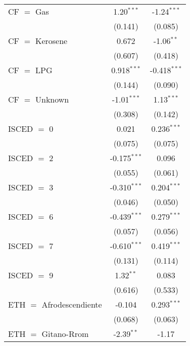 \begin{table}[htbp!]
\begin{adjustbox}{width = 1\textwidth, max height = 0.95\textheight, center}
\begin{threeparttable}[b]
\begin{tabular}{lcc}
            CF $=$ Gas                     & 1.20$^{***}$   & -1.24$^{***}$\\   
                                           & (0.141)        & (0.085)\\   
            CF $=$ Kerosene                & 0.672          & -1.06$^{**}$\\   
                                           & (0.607)        & (0.418)\\   
            CF $=$ LPG                     & 0.918$^{***}$  & -0.418$^{***}$\\   
                                           & (0.144)        & (0.090)\\   
            CF $=$ Unknown                 & -1.01$^{***}$  & 1.13$^{***}$\\   
                                           & (0.308)        & (0.142)\\   
            ISCED $=$ 0                    & 0.021          & 0.236$^{***}$\\   
                                           & (0.075)        & (0.075)\\   
            ISCED $=$ 2                    & -0.175$^{***}$ & 0.096\\   
                                           & (0.055)        & (0.061)\\   
            ISCED $=$ 3                    & -0.310$^{***}$ & 0.204$^{***}$\\   
                                           & (0.046)        & (0.050)\\   
            ISCED $=$ 6                    & -0.439$^{***}$ & 0.279$^{***}$\\   
                                           & (0.057)        & (0.056)\\   
            ISCED $=$ 7                    & -0.610$^{***}$ & 0.419$^{***}$\\   
                                           & (0.131)        & (0.114)\\   
            ISCED $=$ 9                    & 1.32$^{**}$    & 0.083\\   
                                           & (0.616)        & (0.533)\\   
            ETH $=$ Afrodescendiente       & -0.104         & 0.293$^{***}$\\   
                                           & (0.068)        & (0.063)\\   
            ETH $=$ Gitano-Rrom            & -2.39$^{**}$   & -1.17\\   

\end{tabular}
\end{threeparttable}
\end{adjustbox}
\end{table}
